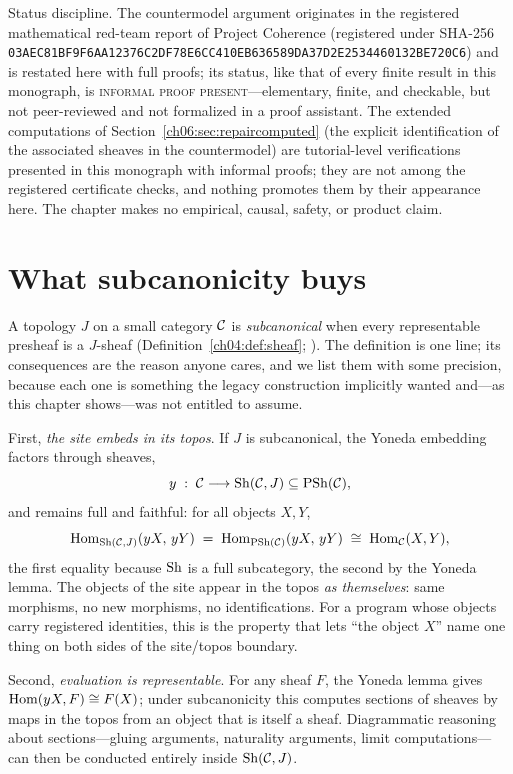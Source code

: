 \begin{boundary}\label{ch06:bnd:status}
Status discipline. The countermodel argument originates in the registered
mathematical red-team report of Project Coherence (registered under SHA-256
\texttt{03AEC81BF9F6AA12376C2DF78E6CC410EB636589DA37D2E2534460132BE720C6})
and is restated here with full proofs; its status, like that of every finite
result in this monograph, is \textsc{informal proof present}---elementary,
finite, and checkable, but not peer-reviewed and not formalized in a proof
assistant. The extended computations of
Section~\ref{ch06:sec:repaircomputed} (the explicit identification of the
associated sheaves in the countermodel) are tutorial-level verifications
presented in this monograph with informal proofs; they are not among the
registered certificate checks, and nothing promotes them by their appearance
here. The chapter makes no empirical, causal, safety, or product claim.
\end{boundary}

\section{What subcanonicity buys}\label{ch06:sec:buys}

A topology $J$ on a small category $\mathcal{C}$ is \emph{subcanonical} when every
representable presheaf is a $J$-sheaf
(Definition~\ref{ch04:def:sheaf}; \cite{maclane,johnstone}). The definition
is one line; its consequences are the reason anyone cares, and we list them
with some precision, because each one is something the legacy
construction implicitly wanted and---as this chapter shows---was not
entitled to assume.

First, \emph{the site embeds in its topos}. If $J$ is subcanonical, the
Yoneda embedding factors through sheaves,
\[
y \;:\; \mathcal{C} \longrightarrow \mathrm{Sh}(\mathcal{C},J) \subseteq \mathrm{PSh}(\mathcal{C}),
\]
and remains full and faithful: for all objects $X,Y$,
\[
\mathrm{Hom}_{\mathrm{Sh}(\mathcal{C},J)}(yX,\,yY)\;=\;\mathrm{Hom}_{\mathrm{PSh}(\mathcal{C})}(yX,\,yY)\;\cong\;\mathrm{Hom}_{\mathcal{C}}(X,Y),
\]
the first equality because $\mathrm{Sh}$ is a full subcategory, the second by the
Yoneda lemma. The objects of the site appear in the topos \emph{as
themselves}: same morphisms, no new morphisms, no identifications. For a
program whose objects carry registered identities, this is the property that
lets ``the object $X$'' name one thing on both sides of the site/topos
boundary.

Second, \emph{evaluation is representable}. For any sheaf $F$, the Yoneda
lemma gives $\mathrm{Hom}(yX,F)\cong F(X)$; under subcanonicity this computes
sections of sheaves by maps in the topos from an object that is itself a
sheaf. Diagrammatic reasoning about sections---gluing arguments, naturality
arguments, limit computations---can then be conducted entirely inside
$\mathrm{Sh}(\mathcal{C},J)$.

